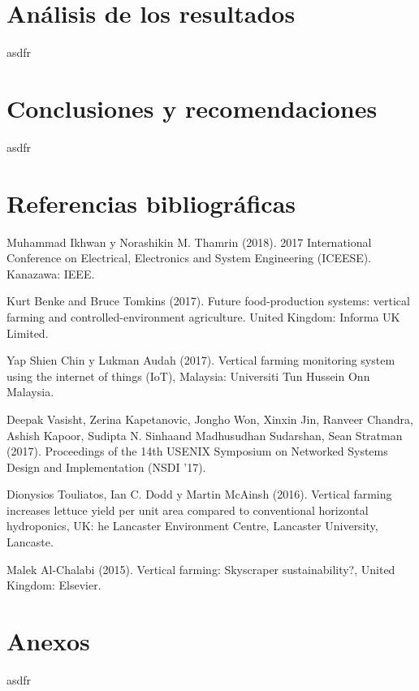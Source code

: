 \documentclass{report}
\begin{document}
\chapter{Análisis de los resultados}
asdfr
\chapter{Conclusiones y recomendaciones}
asdfr
\chapter{Referencias bibliográficas}
Muhammad Ikhwan y Norashikin M. Thamrin (2018). 2017 International Conference on
Electrical, Electronics and System Engineering (ICEESE). Kanazawa: IEEE.

Kurt Benke and Bruce Tomkins (2017). Future food-production systems: vertical
farming and controlled-environment agriculture. United Kingdom: Informa UK
Limited.

Yap Shien Chin y Lukman Audah (2017). Vertical farming monitoring system using
the internet of things (IoT), Malaysia: Universiti Tun Hussein Onn Malaysia.

Deepak Vasisht, Zerina Kapetanovic, Jongho Won, Xinxin Jin, Ranveer Chandra,
Ashish Kapoor, Sudipta N. Sinhaand Madhusudhan Sudarshan, Sean Stratman (2017).
Proceedings of the 14th USENIX Symposium on Networked Systems Design and
Implementation (NSDI ’17).

Dionysios Touliatos, Ian C. Dodd y Martin McAinsh (2016). Vertical farming
increases lettuce yield per unit area compared to conventional horizontal
hydroponics, UK: he Lancaster Environment Centre, Lancaster University,
Lancaste.

Malek Al-Chalabi (2015). Vertical farming: Skyscraper sustainability?, United
Kingdom: Elsevier.
\chapter{Anexos}
asdfr
\end{document}
